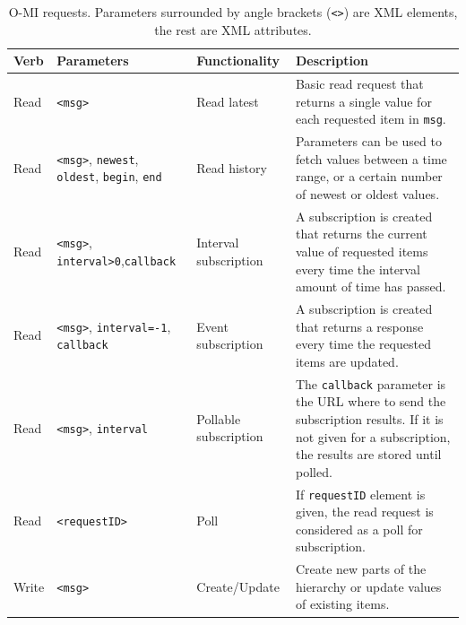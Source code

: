 \begin{table}[H]
  \centering
  \caption{O-MI requests. Parameters surrounded by angle brackets (\texttt{<>}) are XML elements, the rest are XML attributes.}
  \smallskip
  \label{tab:o-mi-requests}
  \selectfont %
  \scriptsize
  \begin{tabular}{|p{}|p{}|p{}|p{}|}
    \hline
    Verb & Parameters & Functionality & Description \\ \hline
    \hline
    Read & \texttt{<msg>} & Read latest & Basic read request that returns a single value for each requested item in \verb+msg+. \\ \hline
    Read & \texttt{<msg>}, \newline \texttt{newest}, \texttt{oldest}, \newline \texttt{begin}, \texttt{end} & Read history & Parameters can be used to fetch values between a time range, or a certain number of newest or oldest values. \\ \hline
    Read & \texttt{<msg>}, \newline \texttt{interval>0},\newline \texttt{callback} & Interval \newline subscription & A subscription is created that returns the current value of requested items every time the interval amount of time has passed. \\ \hline
    Read & \texttt{<msg>}, \newline \texttt{interval=-1}, \newline \texttt{callback} & Event \newline subscription & A subscription is created that returns a response every time the requested items are updated. \\ \hline
    Read & \texttt{<msg>}, \newline \texttt{interval} & Pollable \newline subscription & The \verb+callback+ parameter is the URL where to send the subscription results. If it is not given for a subscription, the results are stored until polled. \\ \hline
    Read & \texttt{<requestID>} & Poll & If \verb+requestID+ element is given, the read request is considered as a poll for subscription. \\ \hline
    Write & \texttt{<msg>} & Create/Update & Create new parts of the hierarchy or update values of existing items. \\ \hline

\end{tabular}
\end{table}
